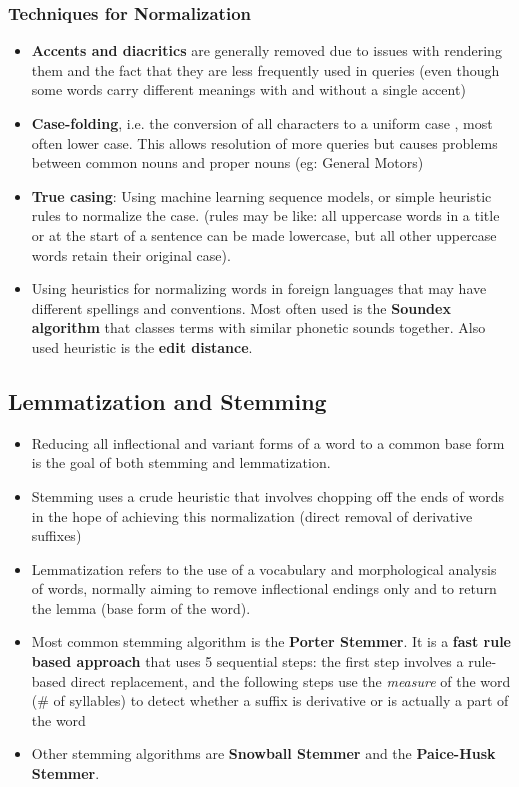 \documentclass{article}
\begin{document}
\subsubsection{Techniques for Normalization}
\begin{itemize}
    \item \textbf{Accents and diacritics} are generally removed due to issues with rendering them and the fact that they are less frequently used in queries (even though some words carry different meanings with and without a single accent)
    
    \item \textbf{Case-folding}, i.e. the conversion of all characters to a uniform case , most often lower case. This allows resolution of more queries but causes problems between common nouns and proper nouns (eg: General Motors)
    
    \item \textbf{True casing}: Using machine learning sequence models, or simple heuristic rules to normalize the case. (rules may be like: all uppercase words in a title or at the start of a sentence can be made lowercase, but all other uppercase words retain their original case). 
    
    \item Using heuristics for normalizing words in foreign languages that may have different spellings and conventions. Most often used is the \textbf{Soundex algorithm} that classes terms with similar phonetic sounds together. Also used heuristic is the \textbf{edit distance}. 
\end{itemize}

\subsection{Lemmatization and Stemming}
\begin{itemize}
    \item Reducing all inflectional and variant forms of a word to a common base form is the goal of both stemming and lemmatization.
    
    \item Stemming uses a crude heuristic that involves chopping off the ends of words in the hope of achieving this normalization (direct removal of derivative suffixes)
    
    \item Lemmatization refers to the use of a vocabulary and morphological analysis of words, normally aiming to remove inflectional endings only and to return the lemma (base form of the word). 
    
    \item Most common stemming algorithm is the \textbf{Porter Stemmer}. It is a\textbf{ fast rule based approach} that uses 5 sequential steps: the first step involves a rule-based direct replacement, and the following steps use the \textit{measure} of the word (\# of syllables) to detect whether a suffix is derivative or is actually a part of the word
    
    \item Other stemming algorithms are \textbf{Snowball Stemmer} and the \textbf{Paice-Husk Stemmer}. 
\end{itemize}
\end{document}
